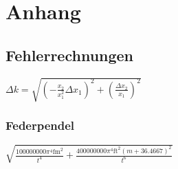 \section{Anhang}
\label{anhang}
\subsection{Fehlerrechnungen}
$\Delta k=\sqrt{(-\frac{x_2}{x_1^2}\Delta x_1)^2+(\frac{\Delta x_2}{x_1})^2}$
\subsubsection{Federpendel}
$\sqrt{\frac{100000000 \pi ^4 \text{fm}^2}{t^4}+\frac{400000000 \pi ^4 \text{ft}^2 (m+36.4667)^2}{t^6}}$